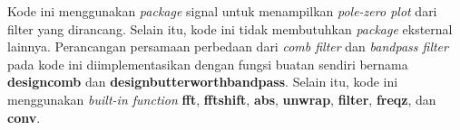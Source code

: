 \documentclass[11pt]{article}
\begin{document}
Kode ini menggunakan \textit{package} signal untuk menampilkan \textit{pole-zero plot} dari filter yang dirancang. Selain itu, kode ini tidak membutuhkan \textit{package} eksternal lainnya. Perancangan persamaan perbedaan dari \textit{comb filter} dan \textit{bandpass filter} pada kode ini diimplementasikan dengan fungsi buatan sendiri bernama \textbf{design\textunderscore comb}  dan \textbf{design\textunderscore butterworth\textunderscore bandpass}. Selain itu, kode ini menggunakan \textit{built-in function} \textbf{fft}, \textbf{fftshift}, \textbf{abs}, \textbf{unwrap}, \textbf{filter}, \textbf{freqz}, dan \textbf{conv}.




\end{document}
